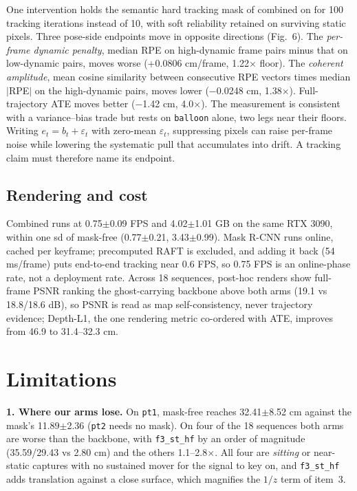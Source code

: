 One intervention holds the semantic hard tracking mask of combined on for 100 tracking iterations instead of 10, with soft reliability retained on surviving static pixels. Three pose-side endpoints move in opposite directions (Fig.~6). The \emph{per-frame dynamic penalty}, median RPE on high-dynamic frame pairs minus that on low-dynamic pairs, moves worse (+0.0806 cm/frame, 1.22$\times$ floor). The \emph{coherent amplitude}, mean cosine similarity between consecutive RPE vectors times median $|$RPE$|$ on the high-dynamic pairs, moves lower ($-$0.0248 cm, 1.38$\times$). Full-trajectory ATE moves better ($-$1.42 cm, 4.0$\times$). The measurement is consistent with a variance--bias trade but rests on \texttt{balloon} alone, two legs near their floors. Writing $e_t=b_t+\varepsilon_t$ with zero-mean $\varepsilon_t$, suppressing pixels can raise per-frame noise while lowering the systematic pull that accumulates into drift. A tracking claim must therefore name its endpoint.


\subsection{Rendering and cost}


Combined runs at 0.75$\pm$0.09 FPS and 4.02$\pm$1.01 GB on the same RTX 3090, within one sd of mask-free (0.77$\pm$0.21, 3.43$\pm$0.99). Mask R-CNN runs online, cached per keyframe; precomputed RAFT is excluded, and adding it back (54 ms/frame) puts end-to-end tracking near 0.6 FPS, so 0.75 FPS is an online-phase rate, not a deployment rate. Across 18 sequences, post-hoc renders show full-frame PSNR ranking the ghost-carrying backbone above both arms (19.1 vs 18.8/18.6 dB), so PSNR is read as map self-consistency, never trajectory evidence; Depth-L1, the one rendering metric co-ordered with ATE, improves from 46.9 to 31.4--32.3 cm.




\section{Limitations}


\textbf{1. Where our arms lose.} On \texttt{pt1}, mask-free reaches 32.41$\pm$8.52 cm against the mask's 11.89$\pm$2.36 (\texttt{pt2} needs no mask). On four of the 18 sequences both arms are worse than the backbone, with \texttt{f3\_st\_hf} by an order of magnitude (35.59/29.43 vs 2.80 cm) and the others 1.1--2.8$\times$. All four are \emph{sitting} or near-static captures with no sustained mover for the signal to key on, and \texttt{f3\_st\_hf} adds translation against a close surface, which magnifies the $1/z$ term of item~3.


